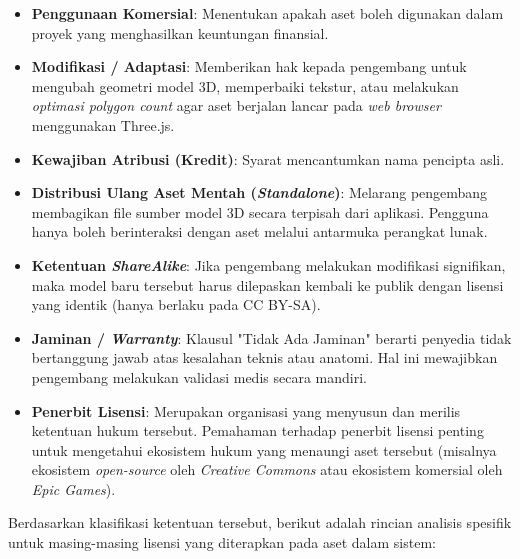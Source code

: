 \begin{itemize}
    \item \textbf{Penggunaan Komersial}: Menentukan apakah aset boleh digunakan dalam proyek yang menghasilkan keuntungan finansial. 
    
    \item \textbf{Modifikasi / Adaptasi}: Memberikan hak kepada pengembang untuk mengubah geometri model 3D, memperbaiki tekstur, atau melakukan \textit{optimasi polygon count} agar aset berjalan lancar pada \textit{web browser} menggunakan Three.js.
    
    \item \textbf{Kewajiban Atribusi (Kredit)}: Syarat mencantumkan nama pencipta asli. 
    
    \item \textbf{Distribusi Ulang Aset Mentah (\textit{Standalone})}: Melarang pengembang membagikan file sumber model 3D secara terpisah dari aplikasi. Pengguna hanya boleh berinteraksi dengan aset melalui antarmuka perangkat lunak.
    
    \item \textbf{Ketentuan \textit{ShareAlike}}: Jika pengembang melakukan modifikasi signifikan, maka model baru tersebut harus dilepaskan kembali ke publik dengan lisensi yang identik (hanya berlaku pada CC BY-SA).
    
    \item \textbf{Jaminan / \textit{Warranty}}: Klausul "Tidak Ada Jaminan" berarti penyedia tidak bertanggung jawab atas kesalahan teknis atau anatomi. Hal ini mewajibkan pengembang melakukan validasi medis secara mandiri.

    \item \textbf{Penerbit Lisensi}: Merupakan organisasi yang menyusun dan merilis ketentuan hukum tersebut. Pemahaman terhadap penerbit lisensi penting untuk mengetahui ekosistem hukum yang menaungi aset tersebut (misalnya ekosistem \textit{open-source} oleh \textit{Creative Commons} atau ekosistem komersial oleh \textit{Epic Games}).

\end{itemize}

Berdasarkan klasifikasi ketentuan tersebut, berikut adalah rincian analisis spesifik untuk masing-masing lisensi yang diterapkan pada aset dalam sistem:

